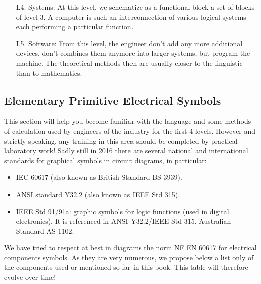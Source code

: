 \begin{enumerate}
		\item[L4.] Systems: At this level, we schematize as a functional block a set of blocks of level 3. A computer is such an interconnection of various logical systems each performing a particular function.
		
		\item[L5.] Software: From this level, the engineer don't add any more additional devices, don't combines them anymore into larger systems, but program the machine. The theoretical methods then are usually closer to the linguistic than to mathematics.
	\end{enumerate}
	
	\subsection{Elementary Primitive Electrical Symbols}	
	This section will help you become familiar with the language and some methods of calculation used by engineers of the industry for the first 4 levels. However and strictly speaking, any training in this area should be completed by practical laboratory work!
	Sadly still in 2016 there are several national and international standards for graphical symbols in circuit diagrams, in particular:
	\begin{itemize}
		\item IEC 60617 (also known as British Standard BS 3939).
		\item ANSI standard Y32.2 (also known as IEEE Std 315).
		\item IEEE Std 91/91a: graphic symbols for logic functions (used in digital electronics). It is referenced in ANSI Y32.2/IEEE Std 315.
Australian Standard AS 1102.
	\end{itemize}
	
	We have tried to respect at best in diagrams the norm NF EN 60617 for electrical components symbols. As they are very numerous, we propose below a list only of the components used or mentioned so far in this book. This table will therefore evolve over time!
	

